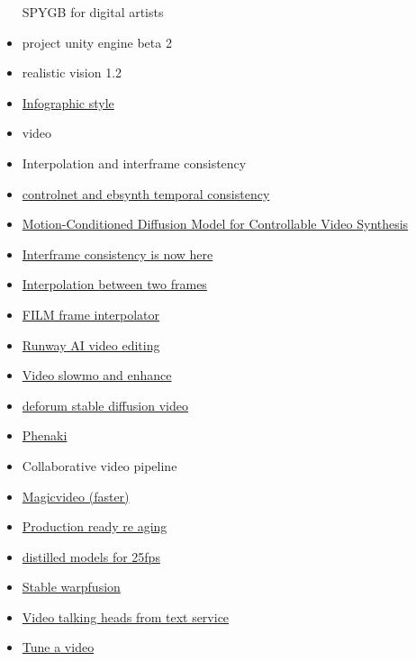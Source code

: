 \begin{itemize}
  SPYGB for digital artists
\item
  project unity engine beta 2
\item
  realistic vision 1.2
\item
  \href{https://civitai.com/models/5271/style-info-an-embedding-for-infographic-style-art}{Infographic
  style}
\item
  video
\item
  Interpolation and interframe consistency
\item
  \href{https://www.reddit.com/r/StableDiffusion/comments/114zmh3/controlnet_and_ebsynth_make_incredible_temporally/}{controlnet
  and ebsynth temporal consistency}
\item
  \href{https://tsaishien-chen.github.io/MCDiff/}{Motion-Conditioned
  Diffusion Model for Controllable Video Synthesis}
\item
  \href{https://twitter.com/cut_pow/status/1576748659051749377}{Interframe
  consistency is now here}
\item
  \href{https://film-net.github.io/}{Interpolation between two frames}
\item
  \href{https://film-net.github.io/}{FILM frame interpolator}
\item
  \href{https://www.youtube.com/c/RunwayML}{Runway AI video editing}
\item
  \href{http://zeyuan-chen.com/VideoINR/}{Video slowmo and enhance}
\item
  \href{https://github.com/HelixNGC7293/DeforumStableDiffusionLocal}{deforum
  stable diffusion video}
\item
  \href{https://phenaki.video/}{Phenaki}
\item
  Collaborative video pipeline
\item
  \href{https://magicvideo.github.io/}{Magicvideo (faster)}
\item
  \href{https://studios.disneyresearch.com/2022/11/30/production-ready-face-re-aging-for-visual-effects/}{Production
  ready re aging}
\item
  \href{https://arxiv.org/abs/2202.00512}{distilled models for 25fps}
\item
  \href{https://www.linkedin.com/posts/rainisto_stablediffusion-musicvideo-remix-activity-7018207241522614272-YT1y?utm_source=share\&utm_medium=member_desktop}{Stable
  warpfusion}
\item
  \href{https://www.synthesia.io/}{Video talking heads from text
  service}
\item
  \href{https://tuneavideo.github.io/}{Tune a video}

\end{itemize}
